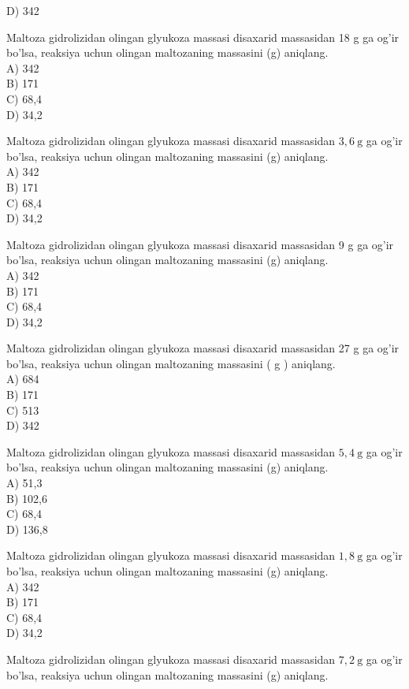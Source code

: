 D) 342
  \item Maltoza gidrolizidan olingan glyukoza massasi disaxarid massasidan 18 g ga og'ir bo'lsa, reaksiya uchun olingan maltozaning massasini (g) aniqlang.\\
A) 342\\
B) 171\\
C) 68,4\\
D) 34,2
  \item Maltoza gidrolizidan olingan glyukoza massasi disaxarid massasidan $3,6 \mathrm{~g}$ ga og'ir bo'lsa, reaksiya uchun olingan maltozaning massasini (g) aniqlang.\\
A) 342\\
B) 171\\
C) 68,4\\
D) 34,2
  \item Maltoza gidrolizidan olingan glyukoza massasi disaxarid massasidan 9 g ga og'ir bo'lsa, reaksiya uchun olingan maltozaning massasini (g) aniqlang.\\
A) 342\\
B) 171\\
C) 68,4\\
D) 34,2
  \item Maltoza gidrolizidan olingan glyukoza massasi disaxarid massasidan 27 g ga og'ir bo'lsa, reaksiya uchun olingan maltozaning massasini ( g ) aniqlang.\\
A) 684\\
B) 171\\
C) 513\\
D) 342
  \item Maltoza gidrolizidan olingan glyukoza massasi disaxarid massasidan $5,4 \mathrm{~g}$ ga og'ir bo'lsa, reaksiya uchun olingan maltozaning massasini (g) aniqlang.\\
A) 51,3\\
B) 102,6\\
C) 68,4\\
D) 136,8
  \item Maltoza gidrolizidan olingan glyukoza massasi disaxarid massasidan $1,8 \mathrm{~g}$ ga og'ir bo'lsa, reaksiya uchun olingan maltozaning massasini (g) aniqlang.\\
A) 342\\
B) 171\\
C) 68,4\\
D) 34,2
  \item Maltoza gidrolizidan olingan glyukoza massasi disaxarid massasidan $7,2 \mathrm{~g}$ ga og'ir bo'lsa, reaksiya uchun olingan maltozaning massasini (g) aniqlang.\\
